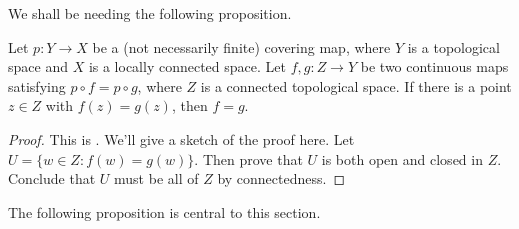 

We shall be needing the following proposition.

\begin{proposition}
\label{prop:if two maps agree on a point then they are equal from szamuely}
Let $p : Y \to X$ be a (not necessarily finite) covering map, where $Y$ is a topological space and $X$ is a locally connected space. Let $f,g : Z \to Y$ be two continuous maps satisfying $p \circ f= p \circ g$, where $Z$ is a connected topological space. If there is a point $z \in Z$ with $f(z) = g(z)$, then $f=g$.
\end{proposition}
\begin{proof}
This is \cite[Proposition 2.2.2]{szamuely}. We'll give a sketch of the proof here. Let $U = \{w \in Z : f(w) = g(w)\}$. Then prove that $U$ is both open and closed in $Z$. Conclude that $U$ must be all of $Z$ by connectedness.
\end{proof}

The following proposition is central to this section.

